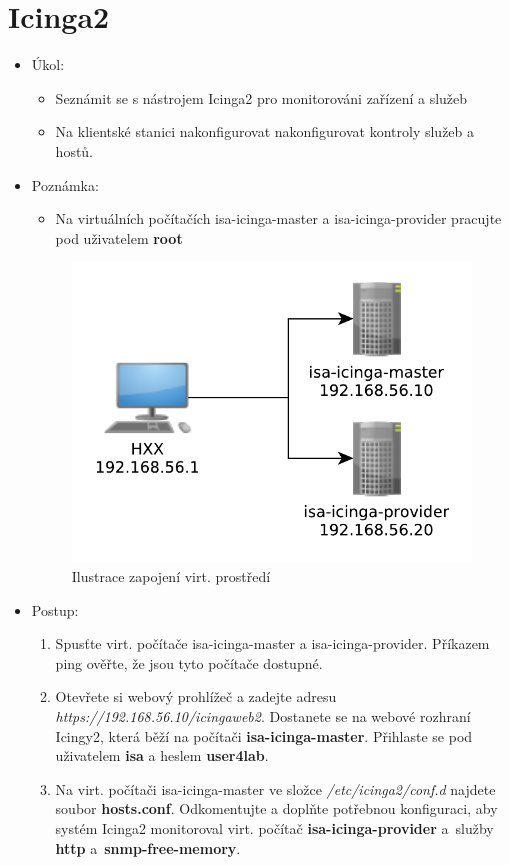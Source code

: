 \section{Icinga2}
  \begin{itemize}
    \item Úkol: 
    \begin{itemize}
      \item Seznámit se s nástrojem Icinga2 pro monitorováni zařízení a služeb 
      \item Na klientské stanici nakonfigurovat nakonfigurovat kontroly služeb a hostů.  
    \end{itemize}
    \item Poznámka:
        \begin{itemize}
            \item Na virtuálních počítačích isa-icinga-master a isa-icinga-provider pracujte pod uživatelem {\bf root}
        \end{itemize}
		\begin{figure}[!ht]
			\caption{Ilustrace zapojení virt. prostředí}
			\centering
	    	\includegraphics*[width=0.5\linewidth]{files/vbox-network.pdf}
		\end{figure}
    \item Postup:
       \begin{enumerate}
       		\item Spusťte virt. počítače isa-icinga-master a isa-icinga-provider. Příkazem ping ověřte, že
       		jsou tyto počítače dostupné.
            \item Otevřete si webový prohlížeč a zadejte adresu 
            {\it https://192.168.56.10/icingaweb2}. Dostanete se na webové rozhraní Icingy2,
            která běží na počítači {\bf isa-icinga-master}. Přihlaste se pod uživatelem {\bf isa} a heslem {\bf user4lab}.
            \item Na virt. počítači isa-icinga-master ve složce {\it /etc/icinga2/conf.d} najdete soubor {\bf hosts.conf}. Odkomentujte a doplňte potřebnou konfiguraci, aby systém Icinga2 
            monitoroval virt. počítač {\bf isa-icinga-provider} a~služby {\bf http} a~{\bf snmp-free-memory}.
            

\end{enumerate}
\end{itemize}

